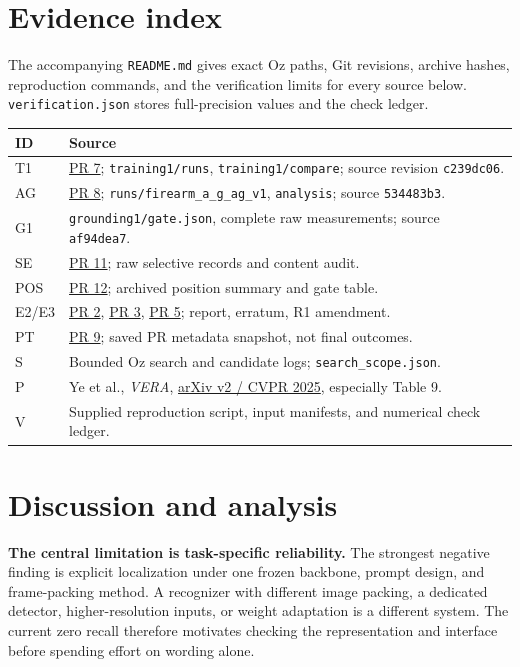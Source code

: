 \documentclass[11pt]{article}
\begin{document}
\section{Evidence index}
\small
The accompanying \texttt{README.md} gives exact Oz paths, Git revisions, archive hashes, reproduction commands, and the verification limits for every source below. \texttt{verification.json} stores full-precision values and the check ledger.
\begin{tabularx}{\linewidth}{@{}lX@{}}\toprule
ID & Source\\\midrule
T1 & \href{https://github.com/shridpant/VERA/pull/7}{PR 7}; \texttt{training1/runs}, \texttt{training1/compare}; source revision \texttt{c239dc06}.\\
AG & \href{https://github.com/shridpant/VERA/pull/8}{PR 8}; \texttt{runs/firearm\_a\_g\_ag\_v1}, \texttt{analysis}; source \texttt{534483b3}.\\
G1 & \texttt{grounding1/gate.json}, complete raw measurements; source \texttt{af94dea7}.\\
SE & \href{https://github.com/shridpant/VERA/pull/11}{PR 11}; raw selective records and content audit.\\
POS & \href{https://github.com/shridpant/VERA/pull/12}{PR 12}; archived position summary and gate table.\\
E2/E3 & \href{https://github.com/shridpant/VERA/pull/2}{PR 2}, \href{https://github.com/shridpant/VERA/pull/3}{PR 3}, \href{https://github.com/shridpant/VERA/pull/5}{PR 5}; report, erratum, R1 amendment.\\
PT & \href{https://github.com/shridpant/VERA/pull/9}{PR 9}; saved PR metadata snapshot, not final outcomes.\\
S & Bounded Oz search and candidate logs; \texttt{search\_scope.json}.\\
P & Ye et al., \emph{VERA}, \href{https://arxiv.org/html/2412.01095v2}{arXiv v2 / CVPR 2025}, especially Table 9.\\
V & Supplied reproduction script, input manifests, and numerical check ledger.\\\bottomrule
\end{tabularx}\normalsize

\section{Discussion and analysis}
\textbf{The central limitation is task-specific reliability.} The strongest negative finding is explicit localization under one frozen backbone, prompt design, and frame-packing method. A recognizer with different image packing, a dedicated detector, higher-resolution inputs, or weight adaptation is a different system. The current zero recall therefore motivates checking the representation and interface before spending effort on wording alone.
\end{document}
